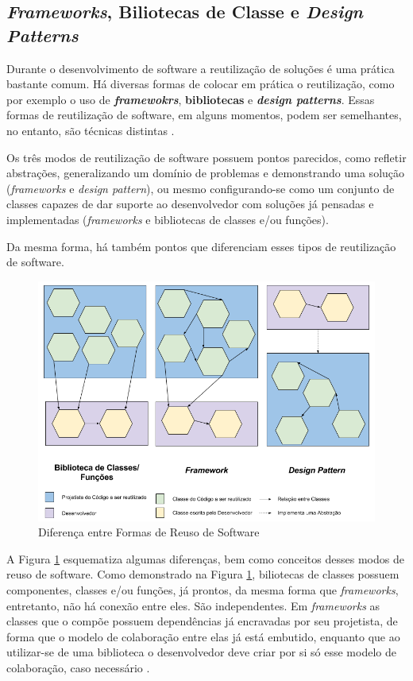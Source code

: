 \subsection{\textit{Frameworks}, Biliotecas de Classe e \textit{Design Patterns}}
Durante o desenvolvimento de software a reutilização de soluções é uma prática bastante comum. Há diversas formas de colocar em prática o reutilização, como por exemplo o uso de \textbf{\textit{framewokrs}}, \textbf{bibliotecas} e \textbf{\textit{design patterns}}. Essas formas de reutilização de software, em alguns momentos, podem ser semelhantes, no entanto, são técnicas distintas \cite{barretoJunior2006}.
\par
\indent Os três modos de reutilização de software possuem pontos parecidos, como refletir abstrações, generalizando um domínio de problemas e demonstrando uma solução (\textit{frameworks} e \textit{design pattern}), ou mesmo configurando-se como um conjunto de classes capazes de dar suporte ao desenvolvedor com soluções já pensadas e implementadas (\textit{frameworks} e bibliotecas de classes e/ou funções).
\par
\indent Da mesma forma, há também pontos que diferenciam esses tipos de reutilização de software.
  \begin{figure}[h]
    \centering
    \includegraphics[width=\textwidth]{figuras/bibFrameworkDesignPattern.png}
    \caption{Diferença entre Formas de Reuso de Software}
    \label{fig:bibFrameworkPattern}
  \end{figure}
\par
\indent A Figura \ref{fig:bibFrameworkPattern} esquematiza algumas diferenças, bem como conceitos desses modos de reuso de software. Como demonstrado na Figura \ref{fig:bibFrameworkPattern}, biliotecas de classes possuem componentes, classes e/ou funções, já prontos, da mesma forma que \textit{frameworks}, entretanto, não há conexão entre eles. São independentes. Em \textit{frameworks} as classes que o compõe possuem dependências já encravadas por seu projetista, de forma que o modelo de colaboração entre elas já está embutido, enquanto que ao utilizar-se de uma biblioteca o desenvolvedor deve criar por si só esse modelo de colaboração, caso necessário \cite{barretoJunior2006}.
